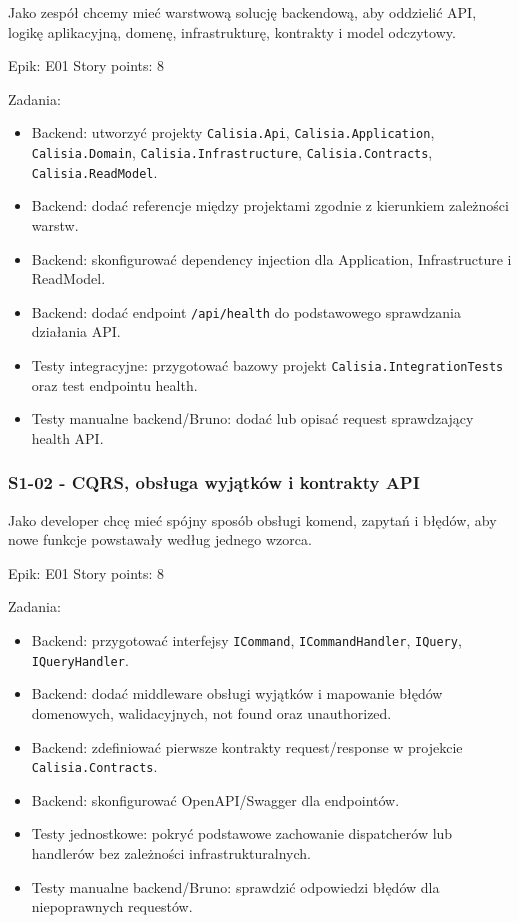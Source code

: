\documentclass[12pt,a4paper]{article}
\begin{document}
Jako zespół chcemy mieć warstwową solucję backendową, aby oddzielić API, logikę aplikacyjną, domenę, infrastrukturę, kontrakty i model odczytowy.

Epik: E01
Story points: 8

Zadania:

\begin{itemize}
\item Backend: utworzyć projekty \texttt{Calisia.Api}, \texttt{Calisia.Application}, \texttt{Calisia.Domain}, \texttt{Calisia.Infrastructure}, \texttt{Calisia.Contracts}, \texttt{Calisia.ReadModel}.
\item Backend: dodać referencje między projektami zgodnie z kierunkiem zależności warstw.
\item Backend: skonfigurować dependency injection dla Application, Infrastructure i ReadModel.
\item Backend: dodać endpoint \texttt{/api/health} do podstawowego sprawdzania działania API.
\item Testy integracyjne: przygotować bazowy projekt \texttt{Calisia.IntegrationTests} oraz test endpointu health.
\item Testy manualne backend/Bruno: dodać lub opisać request sprawdzający health API.
\end{itemize}

\subsubsection*{S1-02 - CQRS, obsługa wyjątków i kontrakty API}

Jako developer chcę mieć spójny sposób obsługi komend, zapytań i błędów, aby nowe funkcje powstawały według jednego wzorca.

Epik: E01
Story points: 8

Zadania:

\begin{itemize}
\item Backend: przygotować interfejsy \texttt{ICommand}, \texttt{ICommandHandler}, \texttt{IQuery}, \texttt{IQueryHandler}.
\item Backend: dodać middleware obsługi wyjątków i mapowanie błędów domenowych, walidacyjnych, not found oraz unauthorized.
\item Backend: zdefiniować pierwsze kontrakty request/response w projekcie \texttt{Calisia.Contracts}.
\item Backend: skonfigurować OpenAPI/Swagger dla endpointów.
\item Testy jednostkowe: pokryć podstawowe zachowanie dispatcherów lub handlerów bez zależności infrastrukturalnych.
\item Testy manualne backend/Bruno: sprawdzić odpowiedzi błędów dla niepoprawnych requestów.
\end{itemize}
\end{document}
